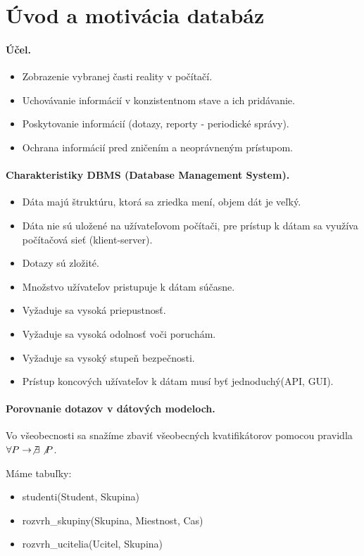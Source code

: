 \documentclass[10pt,a4paper]{article}
\begin{document}
\section*{Úvod a motivácia databáz}
\paragraph{Účel.}
\begin{itemize}
\item Zobrazenie vybranej časti reality v počítačí.
\item Uchovávanie informácií v konzistentnom stave a ich pridávanie.
\item Poskytovanie informácií (dotazy, reporty - periodické správy). 
\item Ochrana informácií pred zničením a neoprávneným prístupom. 
\end{itemize}

\paragraph{Charakteristiky DBMS (Database Management System).}
\begin{itemize}
\item Dáta majú štruktúru, ktorá sa zriedka mení, objem dát je veľký.
\item Dáta nie sú uložené na užívateľovom počítači, pre prístup k dátam sa využíva počítačová sieť (klient-server).
\item Dotazy sú zložité.
\item Množstvo užívateľov pristupuje k dátam súčasne.
\item Vyžaduje sa vysoká priepustnosť.
\item Vyžaduje sa vysoká odolnosť voči poruchám.
\item Vyžaduje sa vysoký stupeň bezpečnosti.
\item Prístup koncových užívateľov k dátam musí byť jednoduchý(API, GUI).
\end{itemize}

\paragraph{Porovnanie dotazov v dátových modeloch.}
Vo všeobecnosti sa snažíme zbaviť všeobecných kvatifikátorov pomocou pravidla $\forall P \rightarrow \not \exists \not P$.

Máme tabuľky: 
\begin{itemize}
\item studenti(Student, Skupina)
\item rozvrh\_skupiny(Skupina, Miestnost, Cas)
\item rozvrh\_ucitelia(Ucitel, Skupina)
\end{itemize}
\end{document}
